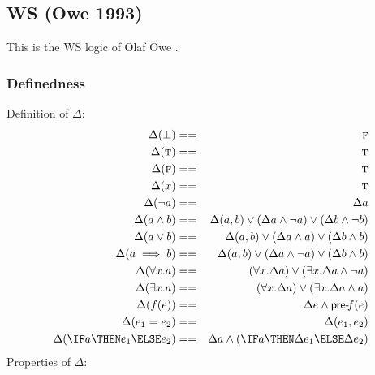 \subsection{\textbf{WS} (Owe 1993)}

\def\F{\textsc{f}}
\def\T{\textsc{t}}
\def\pre#1{\textsf{pre-}\!#1}

This is the WS logic of Olaf Owe \cite{Owe93}.

\subsubsection{Definedness}

Definition of $\Delta$:
\begin{eqnarray*}
   \Delta(\bot)         &==& \F
\\ \Delta(\T)           &==& \T
\\ \Delta(\F)           &==& \T
\\ \Delta(x)            &==& \T
\\ \Delta(\lnot a)      &==& \Delta a
\\ \Delta(a \land b)    &==& \Delta(a,b)
                        \lor (\Delta a \land \lnot a)
                        \lor (\Delta b \land \lnot b)
\\ \Delta(a \lor b)     &==& \Delta(a,b)
                        \lor (\Delta a \land a)
                        \lor (\Delta b \land b)
\\ \Delta(a \implies b) &==& \Delta(a,b)
                        \lor (\Delta a \land \lnot a)
                        \lor (\Delta b \land b)
\\ \Delta(\forall x.a)  &==& (\forall x.\Delta a)
                        \lor (\exists x.\Delta a \land \lnot a)
\\ \Delta(\exists x.a)  &==& (\forall x.\Delta a)
                        \lor (\exists x.\Delta a \land a)
\\ \Delta(f(e))         &==& \Delta e \land \pre f (e)
\\ \Delta(e_1=e_2)      &==& \Delta(e_1,e_2)
\\ \Delta(\IF a \THEN e_1 \ELSE e_2)
   &==&
   \Delta a \land (\IF a \THEN \Delta e_1 \ELSE \Delta e_2)
\end{eqnarray*}
Properties of $\Delta$:
